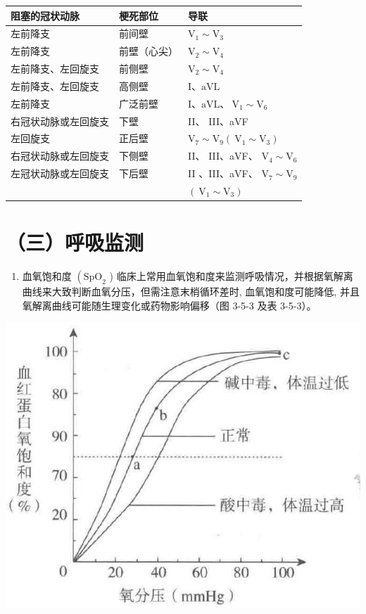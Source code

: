 \documentclass[10pt]{article}
\begin{document}
\begin{center}
\begin{tabular}{lll}
\hline
阻塞的冠状动脉 & 梗死部位 & 导联 \\
\hline
左前降支 & 前间壁 & $\mathrm{V}_{1} \sim \mathrm{V}_{3}$ \\
左前降支 & 前壁（心尖） & $\mathrm{V}_{2} \sim \mathrm{V}_{4}$ \\
左前降支、左回旋支 & 前侧壁 & $\mathrm{V}_{2} \sim \mathrm{V}_{4}$ \\
左前降支、左回旋支 & 高侧壁 & $\mathrm{I} 、 \mathrm{aVL}$ \\
左前降支 & 广泛前壁 & $\mathrm{I} 、 \mathrm{aVL} 、 \mathrm{~V}_{1} \sim \mathrm{V}_{6}$ \\
右冠状动脉或左回旋支 & 下壁 & II、 III、aVF \\
左回旋支 & 正后壁 & $\mathrm{V}_{7} \sim \mathrm{V}_{9}\left(\mathrm{~V}_{1} \sim \mathrm{V}_{3}\right)$ \\
右冠状动脉或左回旋支 & 下侧壁 & II、 III、aVF、 $\mathrm{V}_{4} \sim \mathrm{V}_{6}$ \\
左冠状动脉或左回旋支 & 下后壁 & II 、III、aVF、 $\mathrm{V}_{7} \sim \mathrm{V}_{9}$ \\
 &  & $\left(\mathrm{~V}_{1} \sim \mathrm{V}_{3}\right)$ \\
\hline
\end{tabular}
\end{center}

\section*{（三）呼吸监测}
\begin{enumerate}
  \item 血氧饱和度 $\left(\mathrm{SpO}_{2}\right.$ ) 临床上常用血氧饱和度来监测呼吸情况，并根据氧解离曲线来大致判断血氧分压，但需注意末梢循环差时, 血氧饱和度可能降低, 并且氧解离曲线可能随生理变化或药物影响偏移（图 3-5-3 及表 3-5-3）。
\end{enumerate}

\begin{center}
\includegraphics[max width=\textwidth]{2024_07_05_645bb794a4d4f32ee0c8g-097}
\end{center}
\end{document}
